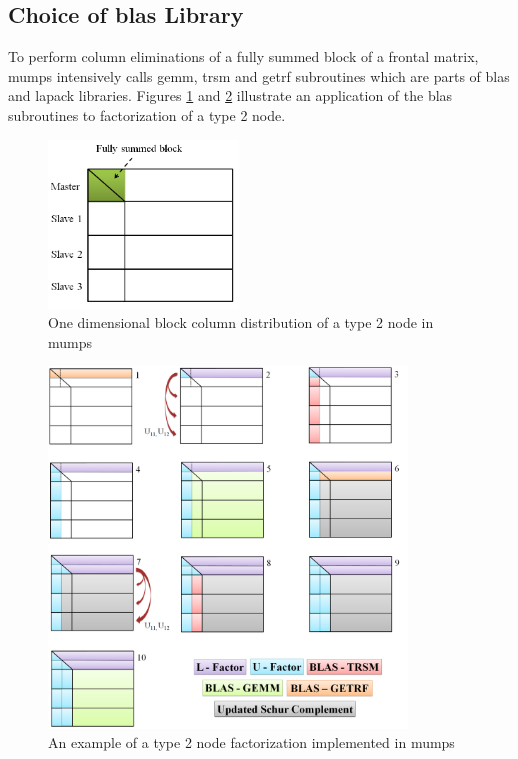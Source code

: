 \subsection{Choice of \gls{blas} Library}
\label{subseq:blas-comparison}


To perform column eliminations of a fully summed block of a frontal matrix, \gls{mumps} intensively calls \gls{gemm}, \gls{trsm} and \gls{getrf} subroutines which are parts of \gls{blas} and \gls{lapack} libraries. Figures \ref{fig:mumps:type-2-frontal-matrix} and  \ref{fig:mumps:steps-of-type-2-factorization} illustrate an application of the \gls{blas} subroutines to factorization of a type 2 node.\\


\figpointer{\ref{fig:mumps:type-2-frontal-matrix}}
\begin{figure}[htpb]
  \centering
  \includegraphics[width=0.45\textwidth]{figures/chapter-2/mumps-type-2-frontal-matrix.png}
\caption{One dimensional block column distribution of a type 2 node in \gls{mumps}}
\label{fig:mumps:type-2-frontal-matrix}
\end{figure}


\figpointer{\ref{fig:mumps:steps-of-type-2-factorization}}
\begin{figure}[htpb]
  \centering
  \includegraphics[width=0.85\textwidth]{figures/chapter-2/mumps-type-2-part-1.png}
\caption{An example of a type 2 node factorization implemented in \gls{mumps}}
\label{fig:mumps:steps-of-type-2-factorization}
\end{figure}


